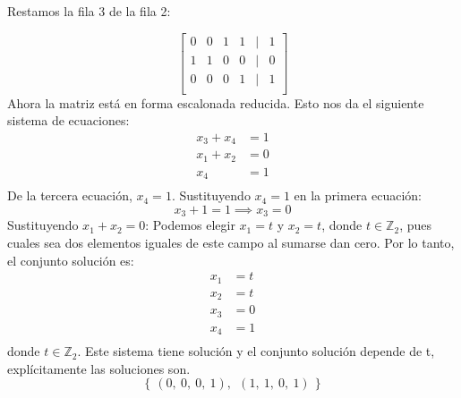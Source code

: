 \begin{solution}
Restamos la fila 3 de la fila 2:

\[
\begin{bmatrix}
0 & 0 & 1 & 1 & \vert & 1 \\
1 & 1 & 0 & 0 & \vert & 0 \\
0 & 0 & 0 & 1 & \vert & 1 \\
\end{bmatrix}
\]
Ahora la matriz está en forma escalonada reducida. Esto nos da el siguiente sistema de ecuaciones:
\[
\begin{aligned}
x_3 + x_4 &= 1 \\
x_1 + x_2 &= 0 \\
x_4 &= 1 \\
\end{aligned}
\]
De la tercera ecuación, $x_4=1$.
Sustituyendo $x_4=1$ en la primera ecuación:
\[
x_3 + 1 = 1 \implies x_3 = 0
\]
Sustituyendo $x_1+x_2=0$:
Podemos elegir $x_1=t$ y $x_2=t$, donde $ t \in \mathbb{Z}_2 $, pues cuales sea dos elementos iguales de este campo al sumarse dan cero.
Por lo tanto, el conjunto solución es:
\[
\begin{aligned}
x_1 &= t \\
x_2 &= t \\
x_3 &= 0 \\
x_4 &= 1 \\
\end{aligned}
\]
donde $ t \in \mathbb{Z}_2 $. Este sistema tiene solución y el conjunto solución depende de t, explícitamente las soluciones son.
\[
\left\{\, (0,\ 0,\ 0,\ 1),\ \ (1,\ 1,\ 0,\ 1) \,\right\}
\]
\end{solution}
